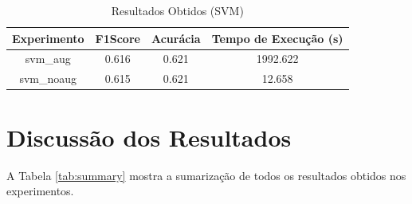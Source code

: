 \documentclass[12pt]{article}
\begin{document}
\begin{table}[!htb]
  \centering
  \begin{tabular}{|c|c|c|c|}
    \hline
    \textbf{Experimento} & \textbf{F1Score} & \textbf{Acurácia} & \textbf{Tempo de Execução (s)} \\ \hline
    svm\_aug             & 0.616            & 0.621             & 1992.622                       \\ \hline
    svm\_noaug           & 0.615            & 0.621             & 12.658                         \\ \hline
  \end{tabular}
  \caption{Resultados Obtidos (SVM)}
  \label{tab:experiment_svm}
\end{table}

\newpage

\section{Discussão dos Resultados}

A Tabela \ref{tab:summary} mostra a sumarização de todos os resultados obtidos nos experimentos.
\end{document}
